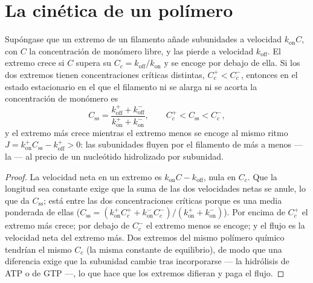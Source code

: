 \section{La cinética de un polímero}

\begin{theorem}\label{thm:b3:cytoskeleton-motility:treadmilling}
Supóngase que un extremo de un filamento añade subunidades a velocidad
$k_{\text{on}}C$, con $C$ la concentración de monómero libre, y las
pierde a velocidad $k_{\text{off}}$. El extremo crece si $C$ supera su
\emph{} $C_{c} = k_{\text{off}}/k_{\text{on}}$ y se
encoge por debajo de ella. Si los dos extremos tienen concentraciones
críticas distintas, $C_{c}^{+}
< C_{c}^{-}$, entonces en el estado estacionario en el que el filamento
ni se alarga ni se acorta la concentración de monómero es
\[
C_{\text{ss}} = \frac{k_{\text{off}}^{+} + k_{\text{off}}^{-}}
{k_{\text{on}}^{+} + k_{\text{on}}^{-}},
\qquad C_{c}^{+} < C_{\text{ss}} < C_{c}^{-},
\]
y el extremo más crece mientras el extremo menos se encoge al mismo
ritmo $J = k_{\text{on}}^{+}C_{\text{ss}} - k_{\text{off}}^{+} > 0$: las
subunidades fluyen por el filamento de más a menos --- la \emph{} --- al precio de un nucleótido hidrolizado por subunidad.
\end{theorem}
\begin{proof}
La velocidad neta en un extremo es $k_{\text{on}}C - k_{\text{off}}$,
nula en $C_{c}$. Que la longitud sea constante exige que la suma de las
dos velocidades netas se anule, lo que da $C_{\text{ss}}$; está entre las
dos concentraciones críticas porque es una media ponderada de ellas
($C_{\text{ss}} =
(k_{\text{on}}^{+}C_{c}^{+} + k_{\text{on}}^{-}C_{c}^{-})/(k_{\text{on}}^{+}
+ k_{\text{on}}^{-})$). Por encima de $C_{c}^{+}$ el extremo más crece;
por debajo de $C_{c}^{-}$ el extremo menos se encoge; y el flujo es la
velocidad neta del extremo más. Dos extremos del mismo polímero químico
tendrían el mismo $C_{c}$ (la misma constante de equilibrio), de modo que
una diferencia exige que la subunidad cambie tras incorporarse --- la
hidrólisis de ATP o de GTP ---, lo que hace que los extremos difieran y
paga el flujo.
\end{proof}

